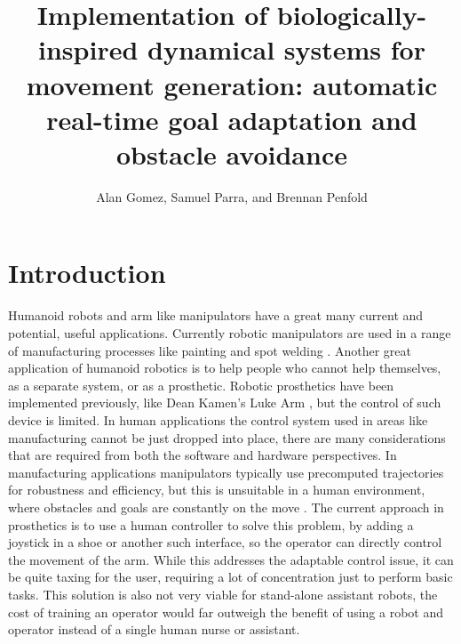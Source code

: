 \documentclass[a4paper, 10pt, conference]{ieeeconf}      %
\title{\LARGE \bf Implementation of biologically-inspired dynamical systems for movement generation: automatic real-time goal adaptation and obstacle avoidance}
\author{Alan Gomez, Samuel Parra, and Brennan Penfold}
\begin{document}
\maketitle
\thispagestyle{empty}
\pagestyle{empty}


\begin{abstract}


\end{abstract}


\section{Introduction} %

Humanoid robots and arm like manipulators have a great many current and potential, useful applications. Currently robotic manipulators are used in a range of manufacturing processes like painting and spot welding \cite{Fadalil}. Another great application of humanoid robotics is to help people who cannot help themselves, as a separate system, or as a prosthetic. Robotic prosthetics have been implemented previously, like Dean Kamen's Luke Arm \cite{Adee}, but the control of such device is limited. In human applications the control system used in areas like manufacturing cannot be just dropped into place, there are many considerations that are required from both the software and hardware perspectives. In manufacturing applications manipulators typically use precomputed trajectories for robustness and efficiency, but this is unsuitable in a human environment, where obstacles and goals are constantly on the move \cite{Hoffmann}. The current approach in prosthetics is to use a human controller to solve this problem, by adding a joystick in a shoe \cite{Adee} or another such interface, so the operator can directly control the movement of the arm. While this addresses the adaptable control issue, it can be quite taxing for the user, requiring a lot of concentration just to perform basic tasks. This solution is also not very viable for stand-alone assistant robots, the cost of training an operator would far outweigh the benefit of using a robot and operator instead of a single human nurse or assistant. \\
\end{document}
